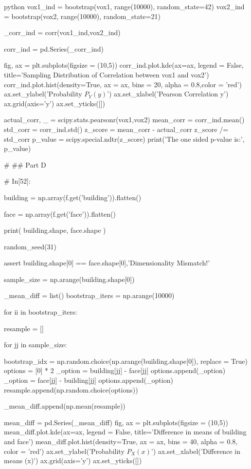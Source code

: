 \documentclass[12pt]{amsart}
\begin{document}
\begin{mintedbox}{python}
vox1_ind = bootstrap(vox1, range(10000), random_state=42)
vox2_ind = bootstrap(vox2, range(10000), random_state=21)

_corr_ind = corr(vox1_ind,vox2_ind)

corr_ind = pd.Series(_corr_ind)


fig, ax = plt.subplots(figsize = (10,5))
corr_ind.plot.kde(ax=ax, legend = False, title='Sampling Distribution of Correlation between vox1 and vox2')
corr_ind.plot.hist(density=True, ax = ax, bins = 20, alpha = 0.8,color = 'red')
ax.set_ylabel('Probability $P_Y(y)$')
ax.set_xlabel('Pearson Correlation y')
ax.grid(axis='y')
ax.set_yticks([])


actual_corr, _ = scipy.stats.pearsonr(vox1,vox2)
mean_corr = corr_ind.mean()
std_corr = corr_ind.std()
z_score = mean_corr - actual_corr
z_score /= std_corr
p_value = scipy.special.ndtr(z_score)
print('The one sided p-value is:', p_value)


# ## Part D

# In[52]:


building = np.array(f.get('building')).flatten()

face = np.array(f.get('face')).flatten()

print(
    building.shape,
    face.shape   
)

random_seed(31)

assert building.shape[0] == face.shape[0],'Dimensionality Mismatch!'

sample_size = np.arange(building.shape[0])

_mean_diff = list()
bootstrap_iters  = np.arange(10000)

for ii in bootstrap_iters:
    
    resample = []
    
    for jj in sample_size:
        
        bootstrap_idx = np.random.choice(np.arange(building.shape[0]), replace = True)
        options = [0] * 2
        _option = building[jj] - face[jj]
        options.append(_option)
        _option = face[jj] - building[jj]
        options.append(_option)
        resample.append(np.random.choice(options))
        
    _mean_diff.append(np.mean(resample))

    
mean_diff = pd.Series(_mean_diff)
fig, ax = plt.subplots(figsize = (10,5))
mean_diff.plot.kde(ax=ax, legend = False, title='Difference in means of building and face')
mean_diff.plot.hist(density=True, ax = ax, bins = 40, alpha = 0.8, color = 'red')
ax.set_ylabel('Probability $P_X(x)$')
ax.set_xlabel('Difference in means (x)')
ax.grid(axis='y')
ax.set_yticks([])



\end{mintedbox}
\end{document}
